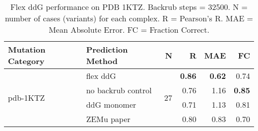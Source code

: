 \begin{table}
  \begin{tabular}{llrrrr}
\toprule
Mutation Category &   Prediction Method &   N &    R &  MAE &   FC \\
\midrule
 \multirow{ 4}{*}{pdb-1KTZ} & flex ddG & \multirow{ 4}{*}{27} & \textbf{0.86} & \textbf{0.62} & 0.74  \\
 & no backrub control & & 0.76 & 1.16 & \textbf{0.85}  \\
 & ddG monomer & & 0.71 & 1.13 & 0.81  \\
 & ZEMu paper & & 0.80 & 0.83 & 0.70  \\
\bottomrule
\end{tabular}
  \caption[Flex ddG performance on PDB 1KTZ]{
    Flex ddG performance on PDB 1KTZ. Backrub steps = 32500. N = number of cases (variants) for each complex. R = Pearson's R. MAE = Mean Absolute Error. FC = Fraction Correct.
  } \label{tab:table-pdb-1KTZ}
\end{table}
